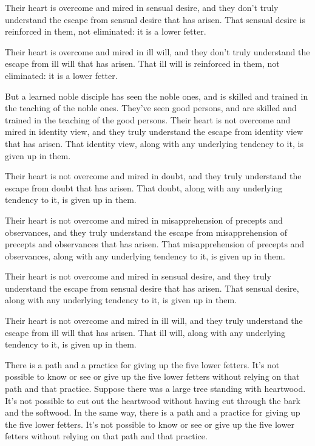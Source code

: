 \documentclass[12pt,openany]{book}%
\begin{document}
Their heart is overcome and mired in sensual desire, and they don’t truly understand the escape from sensual desire that has arisen. That sensual desire is reinforced in them, not eliminated: it is a lower fetter. 

Their heart is overcome and mired in ill will, and they don’t truly understand the escape from ill will that has arisen. That ill will is reinforced in them, not eliminated: it is a lower fetter. 

But a learned noble disciple has seen the noble ones, and is skilled and trained in the teaching of the noble ones. They’ve seen good persons, and are skilled and trained in the teaching of the good persons. Their heart is not overcome and mired in identity view, and they truly understand the escape from identity view that has arisen. That identity view, along with any underlying tendency to it, is given up in them. 

Their heart is not overcome and mired in doubt, and they truly understand the escape from doubt that has arisen. That doubt, along with any underlying tendency to it, is given up in them. 

Their heart is not overcome and mired in misapprehension of precepts and observances, and they truly understand the escape from misapprehension of precepts and observances that has arisen. That misapprehension of precepts and observances, along with any underlying tendency to it, is given up in them. 

Their heart is not overcome and mired in sensual desire, and they truly understand the escape from sensual desire that has arisen. That sensual desire, along with any underlying tendency to it, is given up in them. 

Their heart is not overcome and mired in ill will, and they truly understand the escape from ill will that has arisen. That ill will, along with any underlying tendency to it, is given up in them. 

There is a path and a practice for giving up the five lower fetters. It’s not possible to know or see or give up the five lower fetters without relying on that path and that practice. Suppose there was a large tree standing with heartwood. It’s not possible to cut out the heartwood without having cut through the bark and the softwood. In the same way, there is a path and a practice for giving up the five lower fetters. It’s not possible to know or see or give up the five lower fetters without relying on that path and that practice. 
\end{document}
